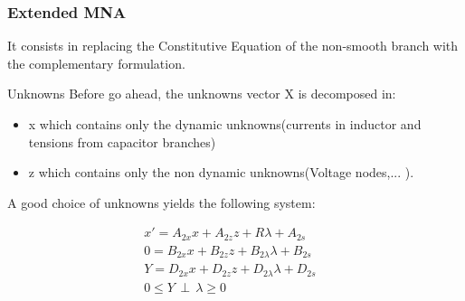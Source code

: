
\frame
{
\frametitle{Extended MNA}
 It consists in replacing the Constitutive Equation of the non-smooth branch with the complementary
 formulation.

 \begin{block}{Unknowns}
 Before go ahead, the unknowns vector X is decomposed in:
\begin{itemize}
\item x which contains only the dynamic unknowns(currents in inductor and tensions from capacitor branches)
\item z which contains only the non dynamic unknowns(Voltage nodes,... ).
\end{itemize}
  \end{block}
  
 \begin{block}{A good choice of unknowns yields the following system:}
 
 \begin{eqnarray}
x'=A_{2x}x +A_{2z}z +R \lambda +A_{2s}&\label{eq2}\\
0=B_{2x}x+B_{2z}z + B_{2\lambda}\lambda + B_{2s}&\label{eq3}\\
Y=D_{2x}x+D_{2z}z+D_{2\lambda}\lambda + D_{2s} &\label{eq4}\\
0 \leq Y \, \perp \, \lambda \geq 0&\label{eqperp}
\end{eqnarray}

  \end{block}


}

